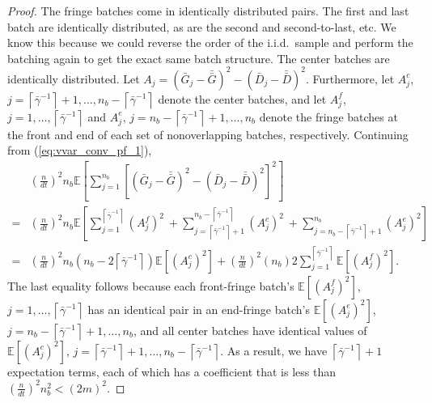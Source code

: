 \documentclass[12pt]{article}
\newcommand{\e}[1]{\mathbb{E} \left[ #1 \right]
}
\newcommand{\gammab}{\bar{\gamma}}
\newcommand{\gb}{\bar{G}}
\newcommand{\gbb}{\bar{\gb}}
\newcommand{\db}{\bar{D}}
\newcommand{\dbb}{\bar{\db}}
\begin{document}
\begin{proof}
	The fringe batches come in identically distributed pairs.  
        The first and last batch are identically distributed, as are the second and second-to-last, etc.  
        We know this because we could reverse the order of the i.i.d.\ sample and perform the batching again to get the exact same batch structure.  
		  The center batches are identically distributed.  
        Let $A_j = (\gb_j - \gbb)^2 - (\db_j - \dbb)^2$.
		  Furthermore, let $A_j^c$, $j=\left\lceil \gammab^{-1} \right\rceil+1, \ldots, n_b - \left\lceil \gammab^{-1} \right\rceil$ denote the center batches, and let $A_j^f$, $j=1,\ldots,\left\lceil \gammab^{-1} \right\rceil$ and $A_j^e$, $j=n_b - \left\lceil \gammab^{-1} \right\rceil+1,\ldots,n_b$ denote the fringe batches at the front and end of each set of nonoverlapping batches, respectively.  
		  Continuing from (\ref{eq:vvar_conv_pf_1}),
	\begin{align*}
		& \left( \frac{n}{dt} \right)^2 n_b \e{ \sum_{j=1}^{n_b} \left[ (\gb_j - \gbb)^2 - (\db_j - \dbb)^2 \right]^2 } \\
		 =  & \left( \frac{n}{dt} \right)^2 n_b \e{\sum_{j=1}^{\left\lceil \gammab^{-1} \right\rceil} \left( A_j^f \right)^2 \
		 + \sum_{j=\left\lceil \gammab^{-1} \right\rceil+1}^{n_b-\left\lceil \gammab^{-1} \right\rceil} \left( A_j^c \right)^2 \
		 + \sum_{j=n_b-\left\lceil \gammab^{-1} \right\rceil+1}^{n_b} \left( A_j^e \right)^2 
		} \\
		 = & \left( \frac{n}{dt} \right)^2 n_b \left(n_b - 2\left\lceil \gammab^{-1} \right\rceil \right) \e{ \left( A_j^c \right)^2 }
		+ \left( \frac{n}{dt} \right)^2 (n_b) 2\sum_{j=1}^{\left\lceil \gammab^{-1} \right\rceil} \e{ \left( A_j^f \right)^2 }.
	\end{align*}	
	The last equality follows because each front-fringe batch's $\e{(A_j^f)^2}$, $j=1,\ldots,\left\lceil \gammab^{-1} \right\rceil$  has an identical pair in an end-fringe batch's $\e{(A_j^e)^2}$, $j=n_b - \left\lceil \gammab^{-1} \right\rceil+1,\ldots,n_b$, and all center batches have identical values of $\e{(A_j^c)^2}$, $j=\left\lceil \gammab^{-1} \right\rceil+1, \ldots, n_b - \left\lceil \gammab^{-1} \right\rceil$.  
	As a result, we have $\left\lceil \gammab^{-1} \right\rceil + 1$ expectation terms, each of which has a coefficient that is less than $\left(\frac{n}{dt}\right)^2n_b^2 < (2m)^2$.  

\end{proof}
\end{document}
